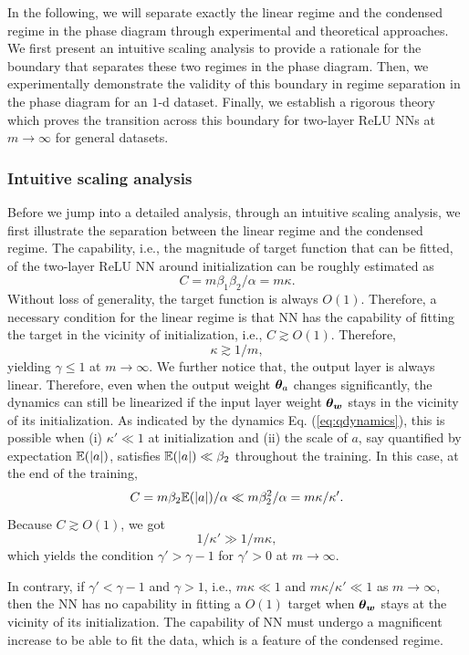 \documentclass{article}
\begin{document}
In the following, we will separate exactly the linear regime and the condensed regime in the phase diagram through experimental and theoretical approaches. We first present an intuitive scaling analysis to provide a rationale for the boundary that separates these two regimes in the phase diagram. Then, we experimentally demonstrate the validity of this boundary in regime separation in the phase diagram for an $1$-d dataset. Finally, we establish a rigorous theory which proves the transition across this boundary for two-layer ReLU NNs at $m\to\infty$ for general datasets.

\subsubsection{Intuitive scaling analysis}
Before we jump into a detailed analysis, through an intuitive scaling analysis, we first illustrate the separation between the linear regime and the condensed regime. The capability, i.e., the magnitude of target function that can be fitted, of the two-layer ReLU NN around initialization can be roughly estimated as
\[
    C = m \beta_1 \beta_2/\alpha=m\kappa.
\]
Without loss of generality, the target function is always $O(1)$. Therefore, a necessary condition for the linear regime is that NN has the capability of fitting the target in the vicinity of initialization, i.e., $C \gtrsim O(1)$. Therefore,
\[
    \kappa \gtrsim 1/m,
\]
yielding $\gamma\leq1$ at $m\to\infty$. We further notice that, the output layer is always linear. Therefore, even when the output weight $\bm{\theta}_{a}$ changes significantly, the dynamics can still be linearized if the input layer weight $\bm{\theta}_{\bm{w}}$ stays in the vicinity of its initialization. As indicated by the dynamics Eq. (\ref{eq:qdynamics}), this is possible when (i) $\kappa' \ll 1$ at initialization and (ii) the scale of $a$, say quantified by expectation $\mathbb{E}(|a|)$, satisfies $\mathbb{E}(|a|) \ll \beta_2$ throughout the training.  In this case, at the end of the training,
\begin{equation}
    C = m\beta_2 \mathbb{E}(|a|)/\alpha  \ll m\beta_2^2/\alpha=m\kappa/\kappa'.
\end{equation}
Because $C \gtrsim O(1)$, we got
\begin{equation}
    1/\kappa'\gg 1/m\kappa,
\end{equation}
which yields the condition $\gamma'>\gamma-1$ for $\gamma'>0$ at $m\to\infty$. 

In contrary, if $\gamma'<\gamma-1$ and $\gamma>1$, i.e., $m\kappa\ll 1$ and $m\kappa/\kappa'\ll 1$ as $m\to\infty$, then the NN has no capability in fitting a $O(1)$ target when $\bm{\theta}_{\bm{w}}$ stays at the vicinity of its initialization. The capability of NN must undergo a magnificent increase to be able to fit the data, which is a feature of the condensed regime.
\end{document}
